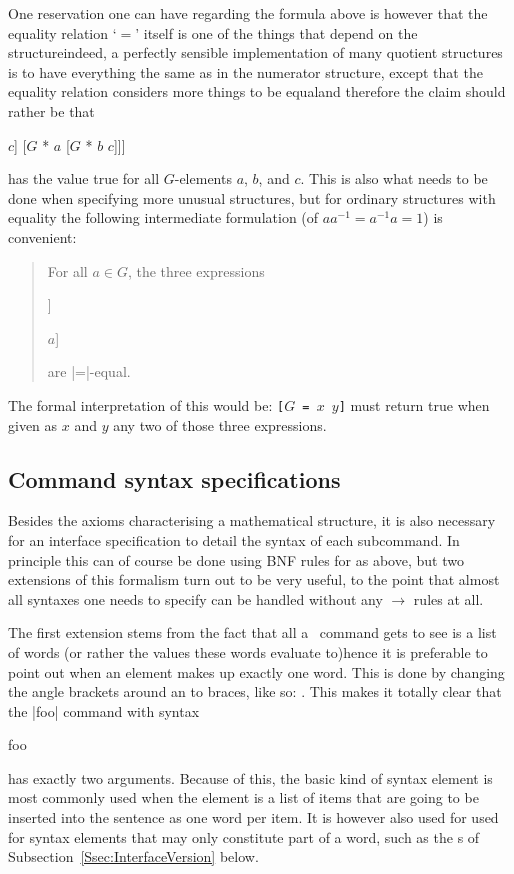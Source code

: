 \documentclass{mtmtcl}
\theoremstyle{plain}
\theoremstyle{remark}
\begin{document}
One reservation one can have regarding the formula above is however 
that the equality relation `$=$' itself is one of the things that 
depend on the structure\Ldash indeed, a perfectly sensible 
implementation of many quotient structures is to have everything the 
same as in the numerator structure, except that the equality relation 
considers more things to be equal\Rdash and therefore the claim 
should rather be that
\begin{displaysyntax}
  [$G$ = [$G$ * [$G$ * $a$ $b$] $c$] [$G$ * $a$ [$G$ * $b$ $c$]]]
\end{displaysyntax}
has the value true for all $G$-elements $a$, $b$, and $c$. This is 
also what needs to be done when specifying more unusual structures, 
but for ordinary structures with equality the following intermediate 
formulation (of \(aa^{-1} = a^{-1}a = 1\)) is convenient:
\begin{quote}
  For all \(a \in G\), the three expressions
  \begin{displaysyntax}
    [$G$ * $a$ [$G$ inverse $a$]]\par
    [$G$ * [$G$ inverse $a$] $a$]\par
    [$G$ 1]
  \end{displaysyntax}
  are |=|-equal.
\end{quote}
The formal interpretation of this would be: \texttt{[$G$ = $x$ $y$]} 
must return true when given as $x$ and $y$ any two of those three 
expressions.


\subsection{Command syntax specifications}

Besides the axioms characterising a mathematical structure, it is 
also necessary for an interface specification to detail the syntax 
of each subcommand. In principle this can of course be done using BNF 
rules for  as above, but two extensions of this 
formalism turn out to be very useful, to the point that almost all 
syntaxes one needs to specify can be handled without any 
$\longrightarrow$ rules at all.

The first extension stems from the fact that all a \Tcl\ command gets 
to see is a list of words (or rather the values these words evaluate 
to)\Dash hence it is preferable to point out when an element makes up 
exactly one word. This is done by changing the angle brackets around 
an  to braces, like so: . This makes it 
totally clear that the |foo| command with syntax
\begin{displaysyntax}
  foo  
\end{displaysyntax}
has exactly two arguments.
Because of this, the basic  kind of syntax element is most 
commonly used when the element is a list of items that are going to 
be inserted into the sentence as one word per item. It is however 
also used for used for syntax elements that may only constitute part 
of a word, such as the s of 
Subsection~\ref{Ssec:InterfaceVersion} below.
\end{document}
